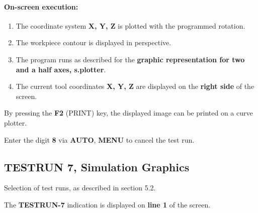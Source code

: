 \begin{itemize}
\end{itemize}

\vspace{.5cm}

\paragraph{On-screen execution:}

\begin{enumerate}
    \item The coordinate system \textbf{X, Y, Z} is plotted with the programmed rotation.
    \item The workpiece contour is displayed in perspective.
    \item The program runs as described for the \textbf{graphic representation for two and a half axes, s.plotter}.
    \item The current tool coordinates \textbf{X, Y, Z} are displayed on the \textbf{right side} of the screen.
\end{enumerate}

By pressing the \textbf{F2} (PRINT) key, the displayed image can be printed on a curve plotter.

\begin{itemize}
\end{itemize}

\vspace{.5cm}

Enter the digit \textbf{8} via \textbf{AUTO}, \textbf{MENU} to cancel the test run.

\newpage

\subsection{TESTRUN 7, Simulation Graphics}

Selection of test runs, as described in section 5.2.

\begin{itemize}
\end{itemize}

\vspace{.5cm}

The \textbf{TESTRUN-7} indication is displayed on \textbf{line 1} of the screen.

